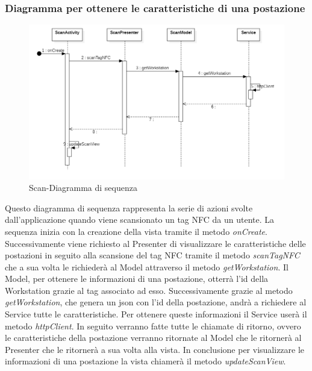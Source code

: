 \subsubsection{Diagramma per ottenere le caratteristiche di una postazione}
\begin{figure}[H]
	\centering
	\includegraphics[width=16cm]{res/images/apputenti-mainScanSeq.png}
	\caption{Scan-Diagramma di sequenza}
	\label{fig:Scan-Diagramma di sequenza}
\end{figure}
Questo diagramma di sequenza rappresenta la serie di azioni svolte dall'applicazione quando viene scansionato un tag NFC da un utente.
La sequenza inizia con la creazione della vista tramite il metodo \textit{onCreate}.
Successivamente viene richiesto al Presenter di visualizzare le caratteristiche delle postazioni in seguito alla scansione del tag NFC tramite il metodo \textit{scanTagNFC} che a sua volta le richiederà al Model attraverso il metodo \textit{getWorkstation}.
Il Model, per ottenere le informazioni di una postazione, otterrà l'id della Workstation grazie al tag associato ad esso.
Successivamente grazie al metodo \textit{getWorkstation}, che genera un json con l'id della postazione, andrà a richiedere al Service tutte le caratteristiche. Per ottenere queste informazioni il Service userà il metodo \textit{httpClient}.
In seguito verranno fatte tutte le chiamate di ritorno, ovvero le caratteristiche della postazione verranno ritornate al Model che le ritornerà
al Presenter che le ritornerà a sua volta alla vista.
In conclusione per visualizzare le informazioni di una postazione la vista chiamerà il metodo \textit{updateScanView}.


